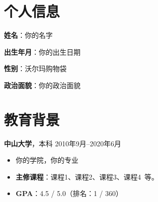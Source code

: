 \documentclass[11pt]{article}
\newlength{\iconwidth}
\begin{document}
    \begin{minipage}[t]{0.78\textwidth}
        \begin{minipage}[t]{\textwidth}
        \section[个人信息]{\makebox[\iconwidth][c]{\color{primary_color}{\faAddressCard}}\quad 个人信息}
        \begin{minipage}[t]{0.5\textwidth}
            \textbf{姓\qquad 名}：你的名字
            
            \vspace{0.5em}
            \textbf{出生年月}：你的出生日期
        \end{minipage}
        \begin{minipage}[t]{0.35\textwidth}
            \textbf{性\qquad 别}：沃尔玛购物袋
            
            \vspace{0.5em}
            \textbf{政治面貌}：你的政治面貌
        \end{minipage}
        \vspace{1.2em}
        \end{minipage}

        \begin{minipage}[t]{\textwidth}
        \section[教育背景]{\makebox[\iconwidth][c]{\color{primary_color}{\faGraduationCap}}\quad 教育背景}
        
        
        \vspace{0.5em}
        {\large \textbf{中山大学}}，本科 \hfill 2010年9月--2020年6月
        \begin{itemize}
            \item 你的学院，你的专业
            \item \textbf{主修课程}：课程1、课程2、课程3、课程4\ 等。
            \item \textbf{GPA}：4.5 / 5.0（排名：1 / 360）
        \end{itemize}
        

\end{minipage}
\end{minipage}
\end{document}
